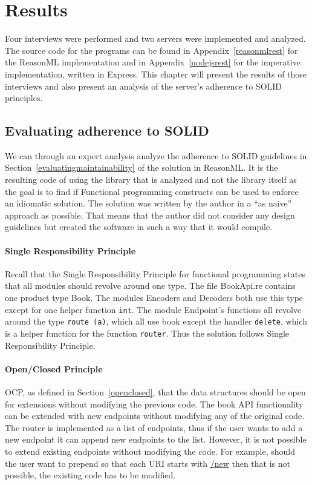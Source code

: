 \chapter{Results}\label{results}

Four interviews were performed and two servers were implemented and analyzed.
The source code for the programs can be found in Appendix~\ref{reasonmlrest} for
the ReasonML implementation and in Appendix~\ref{nodejsrest} for the imperative
implementation, written in Express.  This chapter will present the results of
those interviews and also present an analysis of the server's adherence to SOLID
principles.

\section{Evaluating adherence to SOLID}

We can through an expert analysis analyze the adherence to SOLID guidelines in
Section~\ref{evaluatingmaintainability} of the solution in ReasonML. It is the
resulting code of using the library that is analyzed and not the library itself
as the goal is to find if Functional programming constructs can be used to
enforce an idiomatic solution.  The solution was written by the author in a
``as naive'' approach as possible.  That means that the author did not consider
any design guidelines but created the software in such a way
that it would compile.

\subsubsection{Single Responsibility Principle}

Recall that the Single Responsibility Principle for functional programming
states that all modules should revolve around one type.  The file BookApi.re
contains one product type Book. The modules Encoders and Decoders both use this
type except for one helper function \texttt{int}.  The module Endpoint's
functions all revolve around the type \texttt{route (a)}, which all use book
except the handler \texttt{delete}, which is a helper function for the function
\texttt{router}. Thus the solution follows Single Responsibility Principle.

\subsubsection{Open/Closed Principle}

OCP, as defined in Section~\ref{openclosed}, that the data structures should be
open for extensions without modifying the previous code.  The book API
functionality can be extended with new endpoints without modifying any of the
original code. The router is implemented as a list of endpoints, thus if the
user wants to add a new endpoint it can append new endpoints to the list.
However, it is not possible to extend existing endpoints without modifying the
code.  For example, should the user want to prepend so that each URI starts with
\url{/new} then that is not possible, the existing code has to be modified.

